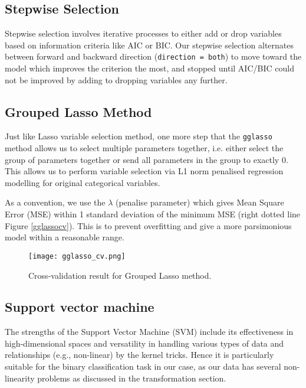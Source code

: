 \documentclass[11pt]{article}
\begin{document}
\subsection{Stepwise Selection}

Stepwise selection involves iterative processes to either add or drop variables based on information criteria like AIC or BIC. Our stepwise selection alternates between forward and backward direction (\texttt{direction = both}) to move toward the model which improves the criterion the most, and stopped until AIC/BIC could not be improved by adding to dropping variables any further. 

\subsection{Grouped Lasso Method}

Just like Lasso variable selection method, one more step that the \texttt{gglasso} method allows us to select multiple parameters together, i.e. either select the group of parameters together or send all parameters in the group to exactly 0. This allows us to perform variable selection via L1 norm penalised regression modelling for original categorical variables. 

As a convention, we use the $\lambda$ (penalise parameter) which gives Mean Square Error (MSE) within 1 standard deviation of the minimum MSE (right dotted line Figure \ref{gglassocv}). This is to prevent overfitting and give a more parsimonious model within a reasonable range. 

\begin{figure}[H]
    \centering
    \texttt{[image: gglasso\_cv.png]}
    \caption{Cross-validation result for Grouped Lasso method.}
    \label{fig:gglassocv}
\end{figure}


\subsection{Support vector machine}

The strengths of the Support Vector Machine (SVM) include its effectiveness in high-dimensional spaces and versatility in handling various types of data and relationships (e.g., non-linear) by the kernel tricks. Hence it is particularly suitable for the binary classification task in our case, as our data has several non-linearity problems as discussed in the transformation section. 
\end{document}
